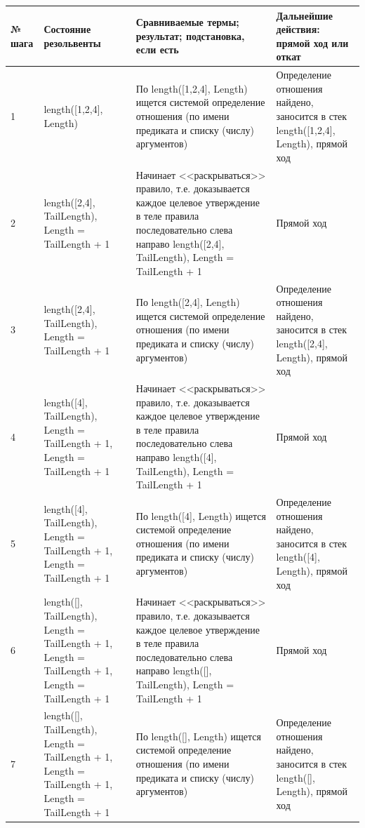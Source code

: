 \documentclass[a4paper,14pt]{extreport} %
\begin{document}
\begin{longtable}{|p{0.5cm}|p{5cm}|p{6cm}|p{5.5cm}|}
	\hline
 	№ шага & Состояние резольвенты & Сравниваемые термы; результат; подстановка, если есть  & Дальнейшие действия: прямой ход или откат \\ \hline
	1 & length([1,2,4], Length) & По length([1,2,4], Length) ищется системой определение отношения (по имени предиката и списку (числу) аргументов) & Определение отношения найдено, заносится в стек length([1,2,4], Length), прямой ход \\ \hline
	
	2 &length([2,4], TailLength), Length = TailLength + 1 & Начинает <<раскрываться>> правило, т.е. доказывается каждое целевое утверждение в теле правила последовательно слева направо
	length([2,4], TailLength), Length = TailLength + 1 & Прямой ход\\ \hline
	
	3 & length([2,4], TailLength), Length = TailLength + 1 & По length([2,4], Length) ищется системой определение отношения (по имени предиката и списку (числу) аргументов) & Определение отношения найдено, заносится в стек length([2,4], Length), прямой ход \\ \hline
	
	4 &length([4], TailLength), Length = TailLength + 1, Length = TailLength + 1 & Начинает <<раскрываться>> правило, т.е. доказывается каждое целевое утверждение в теле правила последовательно слева направо
	length([4], TailLength), Length = TailLength + 1 & Прямой ход\\ \hline

	5 & length([4], TailLength), Length = TailLength + 1, Length = TailLength + 1 & По length([4], Length) ищется системой определение отношения (по имени предиката и списку (числу) аргументов) & Определение отношения найдено, заносится в стек length([4], Length), прямой ход \\ \hline
	
	6 &length([], TailLength), Length = TailLength + 1, Length = TailLength + 1, Length = TailLength + 1 & Начинает <<раскрываться>> правило, т.е. доказывается каждое целевое утверждение в теле правила последовательно слева направо
	length([], TailLength), Length = TailLength + 1 & Прямой ход\\ \hline
	
	7 & length([], TailLength), Length = TailLength + 1, Length = TailLength + 1, Length = TailLength + 1 & По length([], Length) ищется системой определение отношения (по имени предиката и списку (числу) аргументов) & Определение отношения найдено, заносится в стек length([], Length), прямой ход \\ \hline
	

\end{longtable}
\end{document}
